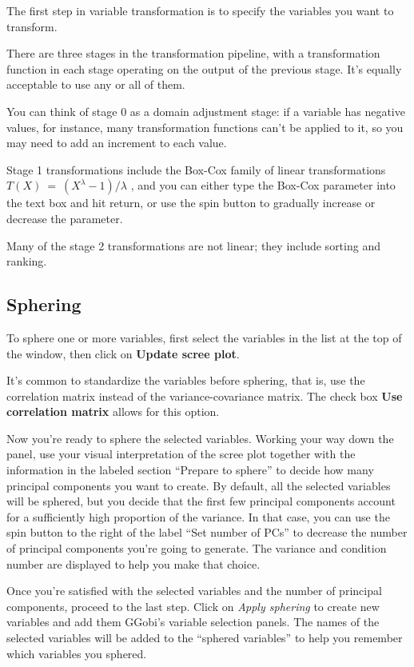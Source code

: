 \documentclass[11pt]{article}
\begin{document}
The first step in variable transformation is to specify the variables
you want to transform.

There are three stages in the transformation pipeline, with a
transformation function in each stage operating on the output of the
previous stage.  It's equally acceptable to use any or all of them.

You can think of stage 0 as a domain adjustment stage:  if a variable
has negative values, for instance, many transformation functions
can't be applied to it, so you may need to add an increment to each
value.

Stage 1 transformations include the Box-Cox family of linear
transformations \( T(X)~=~(X ^ \lambda - 1) / \lambda\) \cite{BoxCox64},
and you can either type the Box-Cox parameter into
the text box and hit return, or use the spin button to gradually
increase or decrease the parameter. 

Many of the stage 2
transformations are not linear; they include sorting and ranking.

\subsection{Sphering}
\label{slbl:Sphering}

To sphere one or more variables, first select the variables in the list
at the top of the window, then click on {\bf Update scree plot}.

It's common to standardize the variables before sphering, that is, use
the correlation matrix instead of the variance-covariance matrix. The
check box {\bf Use correlation matrix} allows for this option.

Now you're ready to sphere the selected variables.  Working your way down
the panel, use your visual interpretation of the scree plot together
with the information in the labeled section ``Prepare to sphere'' to
decide how many principal components you want to create.  By default,
all the selected variables will be sphered, but you decide that the first
few principal components account for a sufficiently high proportion of
the variance.  In that case, you can use the spin button to the right
of the label ``Set number of PCs'' to decrease the number of principal
components you're going to generate.  The variance and condition number
are displayed to help you make that choice.

Once you're satisfied with the selected variables and the number of
principal components, proceed to the last step.  Click on {\em Apply
sphering} to create new variables and add them GGobi's variable selection
panels.  The names of the selected variables will be added to the
``sphered variables'' to help you remember which variables you sphered.
\end{document}
